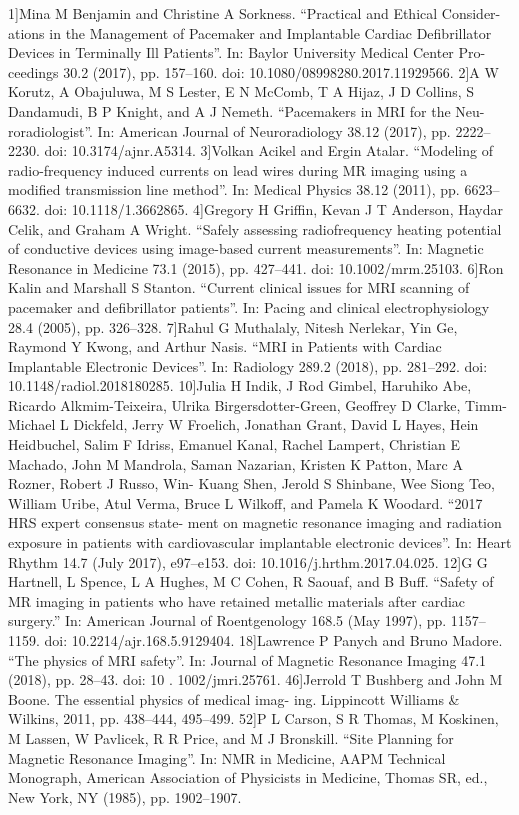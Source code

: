 1]Mina M Benjamin and Christine A Sorkness. “Practical and Ethical Consider-
ations in the Management of Pacemaker and Implantable Cardiac Defibrillator
Devices in Terminally Ill Patients”. In: Baylor University Medical Center Pro-
ceedings 30.2 (2017), pp. 157–160. doi: 10.1080/08998280.2017.11929566.
2]A W Korutz, A Obajuluwa, M S Lester, E N McComb, T A Hijaz, J D Collins,
S Dandamudi, B P Knight, and A J Nemeth. “Pacemakers in MRI for the Neu-
roradiologist”. In: American Journal of Neuroradiology 38.12 (2017), pp. 2222–
2230. doi: 10.3174/ajnr.A5314.
3]Volkan Acikel and Ergin Atalar. “Modeling of radio-frequency induced currents
on lead wires during MR imaging using a modified transmission line method”.
In: Medical Physics 38.12 (2011), pp. 6623–6632. doi: 10.1118/1.3662865.
4]Gregory H Griﬃn, Kevan J T Anderson, Haydar Celik, and Graham A Wright.
“Safely assessing radiofrequency heating potential of conductive devices using
image-based current measurements”. In: Magnetic Resonance in Medicine 73.1
(2015), pp. 427–441. doi: 10.1002/mrm.25103.
6]Ron Kalin and Marshall S Stanton. “Current clinical issues for MRI scanning of
pacemaker and defibrillator patients”. In: Pacing and clinical electrophysiology
28.4 (2005), pp. 326–328.
7]Rahul G Muthalaly, Nitesh Nerlekar, Yin Ge, Raymond Y Kwong, and Arthur
Nasis. “MRI in Patients with Cardiac Implantable Electronic Devices”. In:
Radiology 289.2 (2018), pp. 281–292. doi: 10.1148/radiol.2018180285.
10]Julia H Indik, J Rod Gimbel, Haruhiko Abe, Ricardo Alkmim-Teixeira, Ulrika
Birgersdotter-Green, Geoﬀrey D Clarke, Timm-Michael L Dickfeld, Jerry W
Froelich, Jonathan Grant, David L Hayes, Hein Heidbuchel, Salim F Idriss,
Emanuel Kanal, Rachel Lampert, Christian E Machado, John M Mandrola,
Saman Nazarian, Kristen K Patton, Marc A Rozner, Robert J Russo, Win-
Kuang Shen, Jerold S Shinbane, Wee Siong Teo, William Uribe, Atul Verma,
Bruce L Wilkoﬀ, and Pamela K Woodard. “2017 HRS expert consensus state-
ment on magnetic resonance imaging and radiation exposure in patients with
cardiovascular implantable electronic devices”. In: Heart Rhythm 14.7 (July
2017), e97–e153. doi: 10.1016/j.hrthm.2017.04.025.
12]G G Hartnell, L Spence, L A Hughes, M C Cohen, R Saouaf, and B Buﬀ.
“Safety of MR imaging in patients who have retained metallic materials after
cardiac surgery.” In: American Journal of Roentgenology 168.5 (May 1997),
pp. 1157–1159. doi: 10.2214/ajr.168.5.9129404.
18]Lawrence P Panych and Bruno Madore. “The physics of MRI safety”. In:
Journal of Magnetic Resonance Imaging 47.1 (2018), pp. 28–43. doi: 10 .
1002/jmri.25761.
46]Jerrold T Bushberg and John M Boone. The essential physics of medical imag-
ing. Lippincott Williams \& Wilkins, 2011, pp. 438–444, 495–499.
52]P L Carson, S R Thomas, M Koskinen, M Lassen, W Pavlicek, R R Price, and
M J Bronskill. “Site Planning for Magnetic Resonance Imaging”. In: NMR in
Medicine, AAPM Technical Monograph, American Association of Physicists
in Medicine, Thomas SR, ed., New York, NY (1985), pp. 1902–1907.
